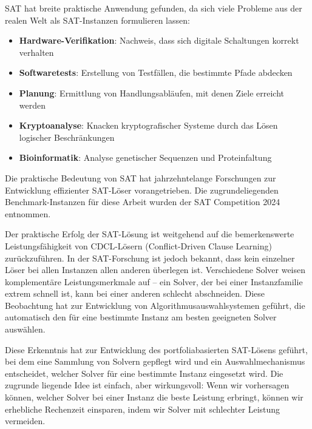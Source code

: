 SAT hat breite praktische Anwendung gefunden, da sich viele Probleme aus der realen Welt als 
SAT-Instanzen formulieren lassen:\cite{cambridge_applications_2012}

\begin{itemize}
    \setlength{\itemsep}{0pt}
    \setlength{\parskip}{0pt}
    \setlength{\parsep}{0pt}
    \item \textbf{Hardware-Verifikation}: Nachweis, dass sich digitale Schaltungen korrekt verhalten
    \item \textbf{Softwaretests}: Erstellung von Testfällen, die bestimmte Pfade abdecken
    \item \textbf{Planung}: Ermittlung von Handlungsabläufen, mit denen Ziele erreicht werden
    \item \textbf{Kryptoanalyse}: Knacken kryptografischer Systeme durch das Lösen logischer Beschränkungen
    \item \textbf{Bioinformatik}: Analyse genetischer Sequenzen und Proteinfaltung
\end{itemize}

Die praktische Bedeutung von SAT hat jahrzehntelange Forschungen zur Entwicklung effizienter SAT-Löser 
vorangetrieben. Die zugrundeliegenden Benchmark-Instanzen für diese Arbeit wurden der 
SAT Competition 2024 entnommen.\cite{satcompetition2024}

Der praktische Erfolg der SAT-Lösung ist weitgehend auf die bemerkenswerte Leistungsfähigkeit von 
CDCL-Lösern (Conflict-Driven Clause Learning) zurückzuführen\cite{springer_cdcl_2020}. In der SAT-Forschung ist jedoch 
bekannt, dass kein einzelner Löser bei allen Instanzen allen anderen überlegen ist\cite{xu2008satzilla}. Verschiedene 
Solver weisen komplementäre Leistungsmerkmale auf – ein Solver, der bei einer Instanzfamilie extrem 
schnell ist, kann bei einer anderen schlecht abschneiden. Diese Beobachtung hat zur Entwicklung von 
Algorithmusauswahlsystemen geführt, die automatisch den für eine bestimmte Instanz am besten 
geeigneten Solver auswählen.

Diese Erkenntnis hat zur Entwicklung des portfoliabasierten SAT-Lösens geführt, bei dem eine Sammlung 
von Solvern gepflegt wird und ein Auswahlmechanismus entscheidet, welcher Solver für eine bestimmte 
Instanz eingesetzt wird\cite{xu2012contribution}. Die zugrunde liegende Idee ist einfach, aber wirkungsvoll: Wenn wir vorhersagen 
können, welcher Solver bei einer Instanz die beste Leistung erbringt, können wir erhebliche Rechenzeit 
einsparen, indem wir Solver mit schlechter Leistung vermeiden.

